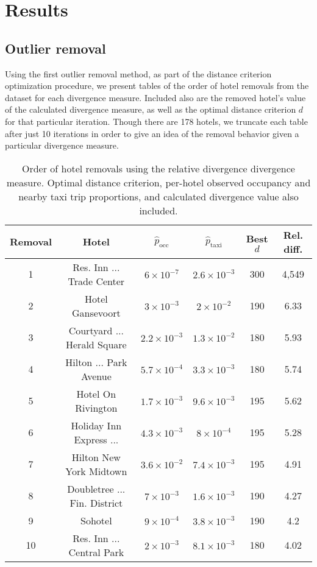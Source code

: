 \documentclass[useAMS, referee, usenatbib]{biom}
\begin{document}
\section{Results}
\label{s:results}

\subsection{Outlier removal}

Using the first outlier removal method, as part of the distance criterion optimization procedure, we present tables of the order of hotel removals from the dataset for each divergence measure. Included also are the removed hotel's value of the calculated divergence measure, as well as the optimal distance criterion $d$ for that particular iteration. Though there are 178 hotels, we truncate each table after just 10 iterations in order to give an idea of the removal behavior given a particular divergence measure.

\begin{table}
\caption{Order of hotel removals using the relative divergence divergence measure. Optimal distance criterion, per-hotel observed occupancy and nearby taxi trip proportions, and calculated divergence value also included.}
\label{t:relative_divergence}
\begin{center}
 \begin{tabular}{||c|c|c|c|c|c||}
 \hline
 Removal & Hotel & $\hat{p}_{\mathrm{occ}}$ & $\hat{p}_{\mathrm{taxi}}$ & Best $d$ & Rel. diff. \\ [0.5ex] 
 \hline
 1 & Res. Inn ... Trade Center & $6 \times 10^{-7}$ & $2.6 \times 10^{-3}$ & 300 & 4,549 \\
 2 & Hotel Gansevoort & $3 \times 10^{-3}$ & $2 \times 10^{-2}$ & 190 & 6.33 \\
 3 & Courtyard ... Herald Square & $2.2 \times 10^{-3}$ & $1.3 \times 10^{-2}$ & 180 & 5.93 \\
 4 & Hilton ... Park Avenue & $5.7 \times 10^{-4}$ & $3.3 \times 10^{-3}$ & 180 & 5.74 \\
 5 & Hotel On Rivington & $1.7 \times 10^{-3}$ & $9.6 \times 10^{-3}$ & 195 & 5.62 \\
 6 & Holiday Inn Express ... & $4.3 \times 10^{-3}$ & $8 \times 10^{-4}$ & 195 & 5.28 \\
 7 & Hilton New York Midtown & $3.6 \times 10^{-2}$ & $7.4 \times 10^{-3}$ & 195 & 4.91 \\
 8 & Doubletree ... Fin. District & $7 \times 10^{-3}$ & $1.6 \times 10^{-3}$ & 190 & 4.27 \\
 9 & Sohotel & $9 \times 10^{-4}$ & $3.8 \times 10^{-3}$ & 190 & 4.2 \\
 10 & Res. Inn ... Central Park & $2 \times 10^{-3}$ & $8.1 \times 10^{-3}$ & 180 & 4.02 \\
 \hline
\end{tabular}
\end{center}
\end{table}
\end{document}
